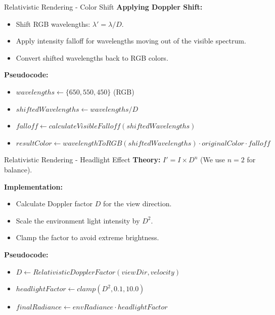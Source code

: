 \documentclass[aspectratio=169,xcolor=dvipsnames]{beamer}
\begin{document}
\begin{frame}{Relativistic Rendering - Color Shift}
    \textbf{Applying Doppler Shift:}
    \begin{itemize}
        \item Shift RGB wavelengths: $\lambda' = \lambda / D$.
        \item Apply intensity falloff for wavelengths moving out of the visible spectrum.
        \item Convert shifted wavelengths back to RGB colors.
    \end{itemize}
    
    \textbf{Pseudocode:}
    \begin{itemize}
        \item $wavelengths \leftarrow \{650, 550, 450\}$ (RGB)
        \item $shiftedWavelengths \leftarrow wavelengths / D$
        \item $falloff \leftarrow calculateVisibleFalloff(shiftedWavelengths)$
        \item $resultColor \leftarrow wavelengthToRGB(shiftedWavelengths) \cdot originalColor \cdot falloff$
    \end{itemize}
\end{frame}

\begin{frame}{Relativistic Rendering - Headlight Effect}
    \textbf{Theory:} $I' = I \times D^n$ (We use $n=2$ for balance).
    
    \textbf{Implementation:}
    \begin{itemize}
        \item Calculate Doppler factor $D$ for the view direction.
        \item Scale the environment light intensity by $D^2$.
        \item Clamp the factor to avoid extreme brightness.
    \end{itemize}
    
    \textbf{Pseudocode:}
    \begin{itemize}
        \item $D \leftarrow RelativisticDopplerFactor(viewDir, velocity)$
        \item $headlightFactor \leftarrow clamp(D^2, 0.1, 10.0)$
        \item $finalRadiance \leftarrow envRadiance \cdot headlightFactor$
    \end{itemize}
\end{frame}
\end{document}

